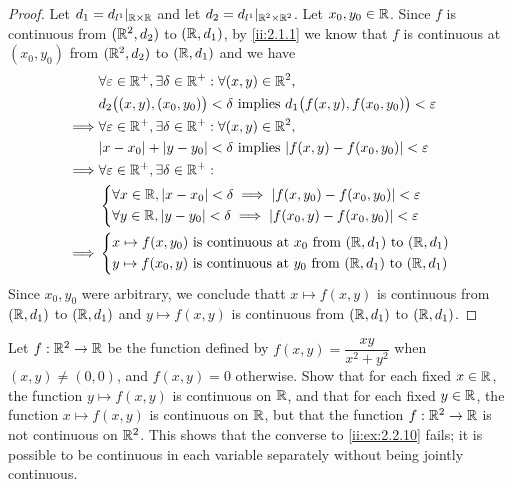 \begin{proof}
  Let \(d_1 = d_{l^1}|_{\mathbb{R} \times \mathbb{R}}\) and let \(d_2 = d_{l^1}|_{\mathbb{R}^2 \times \mathbb{R}^2}\).
  Let \(x_0, y_0 \in \mathbb{R}\).
  Since \(f\) is continuous from \((\mathbb{R}^2, d_2)\) to \((\mathbb{R}, d_1)\), by \cref{ii:2.1.1} we know that \(f\) is continuous at \((x_0, y_0)\) from \((\mathbb{R}^2, d_2)\) to \((\mathbb{R}, d_1)\) and we have
  \begin{align*}
             & \forall \varepsilon \in \R^+, \exists \delta \in \R^+ : \forall (x, y) \in \R^2,                          \\
             & d_2\big((x, y), (x_0, y_0)\big) < \delta \text{ implies } d_1\big(f(x, y), f(x_0, y_0)\big) < \varepsilon \\
    \implies & \forall \varepsilon \in \R^+, \exists \delta \in \R^+ : \forall (x, y) \in \R^2,                          \\
             & \abs{x - x_0} + \abs{y - y_0} < \delta \text{ implies } \abs{f(x, y) - f(x_0, y_0)} < \varepsilon         \\
    \implies & \forall \varepsilon \in \R^+, \exists \delta \in \R^+ :                                                   \\
             & \begin{dcases}
                 \forall x \in \R, \abs{x - x_0} < \delta \implies \abs{f(x, y_0) - f(x_0, y_0)} < \varepsilon \\
                 \forall y \in \R, \abs{y - y_0} < \delta \implies \abs{f(x_0, y) - f(x_0, y_0)} < \varepsilon
               \end{dcases}             \\
    \implies & \begin{dcases}
                 x \mapsto f(x, y_0) \text{ is continuous at } x_0 \text{ from } (\R, d_1) \text{ to } (\R, d_1) \\
                 y \mapsto f(x_0, y) \text{ is continuous at } y_0 \text{ from } (\R, d_1) \text{ to } (\R, d_1)
               \end{dcases}
  \end{align*}
  Since \(x_0, y_0\) were arbitrary, we conclude thatt \(x \mapsto f(x, y)\) is continuous from \((\mathbb{R}, d_1)\) to \((\mathbb{R}, d_1)\) and \(y \mapsto f(x, y)\) is continuous from \((\mathbb{R}, d_1)\) to \((\mathbb{R}, d_1)\).
\end{proof}

\begin{ex}\label{ii:ex:2.2.11}
  Let \(f : \mathbb{R}^2 \to \mathbb{R}\) be the function defined by \(f(x, y) = \dfrac{xy}{x^2 + y^2}\) when \((x, y) \neq (0, 0)\), and \(f(x, y) = 0\) otherwise.
  Show that for each fixed \(x \in \mathbb{R}\), the function \(y \mapsto f(x, y)\) is continuous on \(\mathbb{R}\), and that for each fixed \(y \in \mathbb{R}\), the function \(x \mapsto f(x, y)\) is continuous on \(\mathbb{R}\), but that the function \(f : \mathbb{R}^2 \to \mathbb{R}\) is not continuous on \(\mathbb{R}^2\).
  This shows that the converse to \cref{ii:ex:2.2.10} fails;
  it is possible to be continuous in each variable separately without being jointly continuous.
\end{ex}

